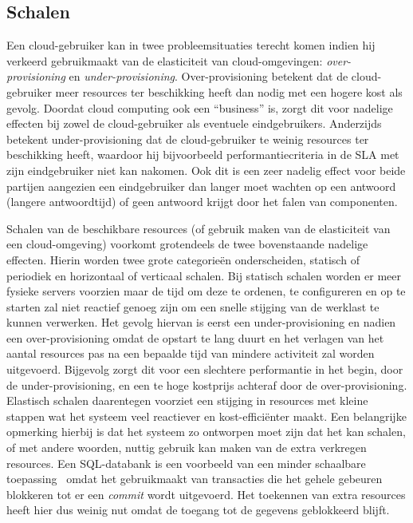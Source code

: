 \subsection{Schalen}

Een cloud-gebruiker kan in twee probleemsituaties terecht komen indien hij verkeerd gebruikmaakt van de elasticiteit van cloud-omgevingen: \textit{over-provisioning} en \textit{under-provisioning}. Over-provisioning betekent dat de cloud-gebruiker meer resources ter beschikking heeft dan nodig met een hogere kost als gevolg. Doordat cloud computing ook een ``business'' is, zorgt dit voor nadelige effecten bij  zowel de cloud-gebruiker als eventuele eindgebruikers. Anderzijds betekent under-provisioning dat de cloud-gebruiker te weinig resources ter beschikking heeft, waardoor hij bijvoorbeeld performantiecriteria in de SLA met zijn eindgebruiker niet kan nakomen. Ook dit is een zeer nadelig effect voor beide partijen aangezien een eindgebruiker dan langer moet wachten op een antwoord (langere antwoordtijd) of geen antwoord krijgt door het falen van componenten.

Schalen van de beschikbare resources (of gebruik maken van de elasticiteit van een cloud-omgeving) voorkomt grotendeels de twee bovenstaande nadelige effecten. Hierin worden twee grote categorieën onderscheiden, statisch of periodiek en horizontaal of verticaal schalen. Bij statisch schalen worden er meer fysieke servers voorzien maar de tijd om deze te ordenen, te configureren en op te starten zal niet reactief genoeg zijn om een snelle stijging van de werklast te kunnen verwerken. Het gevolg hiervan is eerst een under-provisioning en nadien een over-provisioning omdat de opstart te lang duurt en het verlagen van het aantal resources pas na een bepaalde tijd van mindere activiteit zal worden uitgevoerd. Bijgevolg zorgt dit voor een slechtere performantie in het begin, door de under-provisioning, en een te hoge kostprijs achteraf door de over-provisioning.
Elastisch schalen daarentegen voorziet een stijging in resources met kleine stappen wat het systeem veel reactiever en kost-efficiënter maakt. Een belangrijke opmerking hierbij is dat het systeem zo ontworpen moet zijn dat het kan schalen, of met andere woorden, nuttig gebruik kan maken van de extra verkregen resources. Een SQL-databank is een voorbeeld van een minder schaalbare toepassing~\cite{Vaquero2011} omdat het gebruikmaakt van transacties die het gehele gebeuren blokkeren tot er een \textit{commit} wordt uitgevoerd. Het toekennen van extra resources heeft hier dus weinig nut omdat de toegang tot de gegevens geblokkeerd blijft.

